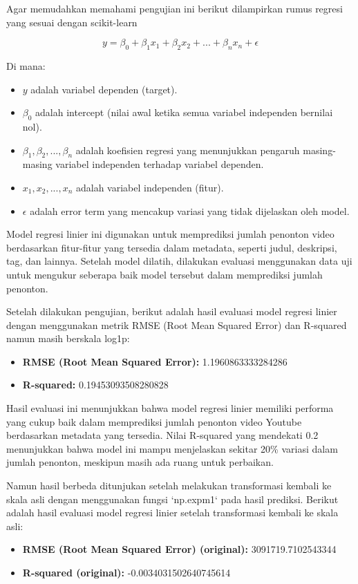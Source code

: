 Agar memudahkan memahami pengujian ini berikut dilampirkan rumus regresi yang sesuai dengan scikit-learn 

\begin{equation}
    y = \beta_0 + \beta_1 x_1 + \beta_2 x_2 + ... + \beta_n x_n + \epsilon
\end{equation}

Di mana:
\begin{itemize}
    \item $y$ adalah variabel dependen (target).
    \item $\beta_0$ adalah intercept (nilai awal ketika semua variabel independen bernilai nol).
    \item $\beta_1, \beta_2, ..., \beta_n$ adalah koefisien regresi yang menunjukkan pengaruh masing-masing variabel independen terhadap variabel dependen.
    \item $x_1, x_2, ..., x_n$ adalah variabel independen (fitur).
    \item $\epsilon$ adalah error term yang mencakup variasi yang tidak dijelaskan oleh model.
\end{itemize}

Model regresi linier ini digunakan untuk memprediksi jumlah penonton video berdasarkan fitur-fitur yang tersedia dalam metadata, seperti judul, deskripsi, tag, dan lainnya. Setelah model dilatih, dilakukan evaluasi menggunakan data uji untuk mengukur seberapa baik model tersebut dalam memprediksi jumlah penonton.

Setelah dilakukan pengujian, berikut adalah hasil evaluasi model regresi linier dengan menggunakan metrik RMSE (Root Mean Squared Error) dan R-squared namun masih berskala log1p:

\begin{itemize}
    \item \textbf{RMSE (Root Mean Squared Error):} 1.1960863333284286
    \item \textbf{R-squared:} 0.19453093508280828
\end{itemize}

Hasil evaluasi ini menunjukkan bahwa model regresi linier memiliki performa yang cukup baik dalam memprediksi jumlah penonton video Youtube berdasarkan metadata yang tersedia. Nilai R-squared yang mendekati 0.2 menunjukkan bahwa model ini mampu menjelaskan sekitar 20\% variasi dalam jumlah penonton, meskipun masih ada ruang untuk perbaikan.

Namun hasil berbeda ditunjukan setelah melakukan transformasi kembali ke skala asli dengan menggunakan fungsi `np.expm1` pada hasil prediksi. Berikut adalah hasil evaluasi model regresi linier setelah transformasi kembali ke skala asli:
\begin{itemize}
    \item \textbf{RMSE (Root Mean Squared Error) (original):} 3091719.7102543344
    \item \textbf{R-squared (original):} -0.0034031502640745614
\end{itemize}

